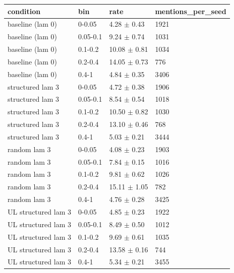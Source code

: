 \begin{tabular}{llll}
\hline
condition & bin & rate & mentions\_per\_seed \\
\hline
baseline (lam 0) & 0-0.05 & 4.28 $\pm$ 0.43 & 1921 \\
baseline (lam 0) & 0.05-0.1 & 9.24 $\pm$ 0.74 & 1031 \\
baseline (lam 0) & 0.1-0.2 & 10.08 $\pm$ 0.81 & 1034 \\
baseline (lam 0) & 0.2-0.4 & 14.05 $\pm$ 0.73 & 776 \\
baseline (lam 0) & 0.4-1 & 4.84 $\pm$ 0.35 & 3406 \\
structured lam 3 & 0-0.05 & 4.72 $\pm$ 0.38 & 1906 \\
structured lam 3 & 0.05-0.1 & 8.54 $\pm$ 0.54 & 1018 \\
structured lam 3 & 0.1-0.2 & 10.50 $\pm$ 0.82 & 1030 \\
structured lam 3 & 0.2-0.4 & 13.10 $\pm$ 0.46 & 768 \\
structured lam 3 & 0.4-1 & 5.03 $\pm$ 0.21 & 3444 \\
random lam 3 & 0-0.05 & 4.08 $\pm$ 0.23 & 1903 \\
random lam 3 & 0.05-0.1 & 7.84 $\pm$ 0.15 & 1016 \\
random lam 3 & 0.1-0.2 & 9.81 $\pm$ 0.62 & 1026 \\
random lam 3 & 0.2-0.4 & 15.11 $\pm$ 1.05 & 782 \\
random lam 3 & 0.4-1 & 4.76 $\pm$ 0.28 & 3425 \\
UL structured lam 3 & 0-0.05 & 4.85 $\pm$ 0.23 & 1922 \\
UL structured lam 3 & 0.05-0.1 & 8.49 $\pm$ 0.50 & 1012 \\
UL structured lam 3 & 0.1-0.2 & 9.69 $\pm$ 0.61 & 1035 \\
UL structured lam 3 & 0.2-0.4 & 13.58 $\pm$ 0.16 & 744 \\
UL structured lam 3 & 0.4-1 & 5.34 $\pm$ 0.21 & 3455 \\
\hline
\end{tabular}
